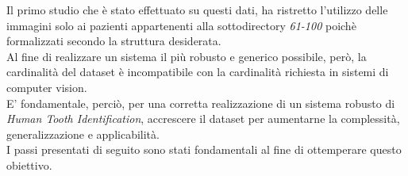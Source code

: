 \documentclass[12pt,a4paper,openright,twoside]{book}
\begin{document}
Il primo studio che è stato effettuato su questi dati, ha ristretto l'utilizzo delle immagini solo ai pazienti appartenenti alla sottodirectory {\itshape 61-100} poichè formalizzati secondo la struttura desiderata.\\
Al fine di realizzare un sistema il più robusto e generico possibile, però, la cardinalità del dataset è incompatibile con la cardinalità richiesta in sistemi di computer vision.\\
E' fondamentale, perciò, per una corretta realizzazione di un sistema robusto di {\itshape Human Tooth Identification}, accrescere il dataset per aumentarne la complessità, generalizzazione e applicabilità.\\
I passi presentati di seguito sono stati fondamentali al fine di ottemperare questo obiettivo.

\end{document}
